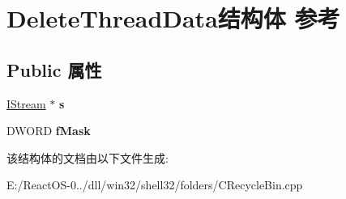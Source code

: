 \hypertarget{struct_delete_thread_data}{}\section{Delete\+Thread\+Data结构体 参考}
\label{struct_delete_thread_data}
\subsection*{Public 属性}
\begin{DoxyCompactItemize}
\item 
\mbox{\label{struct_delete_thread_data_a1740d7a3cc54f15e059d11e63752872b}} 
\hyperlink{interface_i_stream}{I\+Stream} $\ast$ {\bfseries s}
\item 
\mbox{\label{struct_delete_thread_data_acc312d8844ea92cfc3604eaa66766652}} 
D\+W\+O\+RD {\bfseries f\+Mask}
\end{DoxyCompactItemize}


该结构体的文档由以下文件生成\+:\begin{DoxyCompactItemize}
\item 
E\+:/\+React\+O\+S-\/0../dll/win32/shell32/folders/C\+Recycle\+Bin.\+cpp\end{DoxyCompactItemize}
